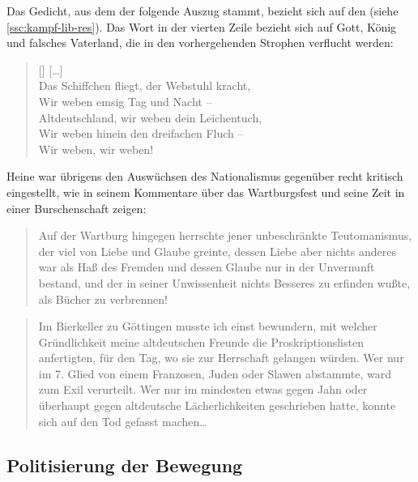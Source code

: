 Das Gedicht, aus dem der folgende Auszug stammt, bezieht sich auf den
 (siehe
\ref{ssc:kampf-lib-res}). Das Wort  in der vierten
Zeile bezieht sich auf Gott, König und falsches Vaterland, die in den
vorhergehenden Strophen verflucht werden:

\settowidth{\versewidth}{Altdeutschland, wir weben dein Leichentuch,}

\begin{verse}[\versewidth]
\mbox{[\dots]} \\
Das Schiffchen fliegt, der Webstuhl kracht, \\
Wir weben emsig Tag und Nacht -- \\
Altdeutschland, wir weben dein Leichentuch, \\
Wir weben hinein den dreifachen Fluch -- \\
\vin Wir weben, wir weben!\flq \\
\end{verse}

Heine war übrigens den Auswüchsen des Nationalismus gegenüber
recht kritisch eingestellt, wie in seinem Kommentare über das
Wartburgsfest und seine Zeit in einer 
Burschenschaft zeigen:

\blockquote{Auf der Wartburg hingegen herrschte jener unbeschränkte
Teutomanismus, der viel von Liebe und Glaube greinte, dessen Liebe
aber nichts anderes war als Haß des Fremden und dessen Glaube nur in
der Unvernunft bestand, und der in seiner Unwissenheit nichts Besseres
zu erfinden wußte, als Bücher zu verbrennen!}

\blockquote[{}]{Im Bierkeller zu Göttingen musste
ich einst bewundern, mit welcher Gründlichkeit meine altdeutschen
Freunde die Proskriptionslisten anfertigten, für den Tag, wo sie zur
Herrschaft gelangen würden. Wer nur im 7. Glied von einem Franzosen,
Juden oder Slawen abstammte, ward zum Exil verurteilt. Wer nur im
mindesten etwas gegen Jahn oder überhaupt gegen altdeutsche
Lächerlichkeiten geschrieben hatte, konnte sich auf den Tod gefasst
machen\dots}




\subsection{Politisierung der Bewegung}

